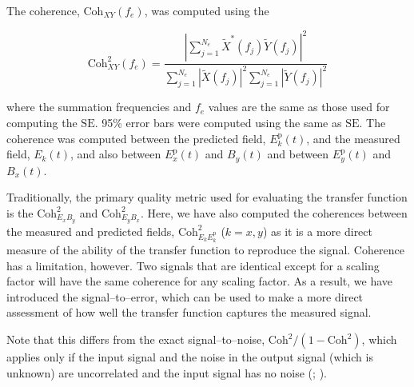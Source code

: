 \documentclass[draft,linenumbers]{agujournal2018}
\begin{document}
The coherence, $\text{Coh}_{XY}(f_e)$, was computed using the 

\begin{equation}
\text{Coh}^2_{XY}(f_e) = \frac{\left|\displaystyle\sum_{j=1}^{N_e}\widetilde{X}^*(f_j)\widetilde{Y}(f_j)\right|^2}{\displaystyle\sum_{j=1}^{N_e} \left|\widetilde{X}(f_j)\right|^2\sum_{j=1}^{N_e} \left|\widetilde{Y}(f_j)\right|^2}
\end{equation}

\noindent where the summation frequencies and $f_e$ values are the same as those used for computing the $\text{SE}$. 95\% error bars were computed using the same as $\text{SE}$. The coherence was computed between the predicted field, $E^\text{p}_k(t)$, and the measured field, $E_k(t)$, and also between $E_x^\text{p}(t)$ and $B_y(t)$ and between $E_y^\text{p}(t)$ and $B_x(t)$.

Traditionally, the primary quality metric used for evaluating the transfer function is the $\text{Coh}^2_{E_xB_y}$ and $\text{Coh}^2_{E_yB_x}$. Here, we have also computed the coherences between the measured and predicted fields, $\text{Coh}^2_{E_kE^\text{p}_k}$ ($k=x,y$) as it is a more direct measure of the ability of the transfer function to reproduce the signal. Coherence has a limitation, however. Two signals that are identical except for a scaling factor will have the same coherence for any scaling factor. As a result, we have introduced the signal--to--error, which can be used to make a more direct assessment of how well the transfer function captures the measured signal.

Note that this differs from the exact signal--to--noise, $\text{Coh}^2/(1-\text{Coh}^2)$, which applies only if the input signal and the noise in the output signal (which is unknown) are uncorrelated and the input signal has no noise (\cite{Miranda2006}; \cite{Pedersen1988}).

\end{document}
